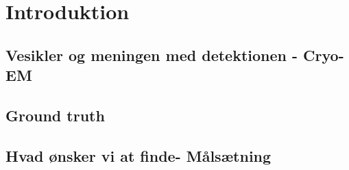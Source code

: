 \section{Introduktion} %
\subsection{Vesikler og meningen med detektionen - Cryo-EM} %
\subsection{Ground truth}									%
\subsection{Hvad ønsker vi at finde- Målsætning}			%